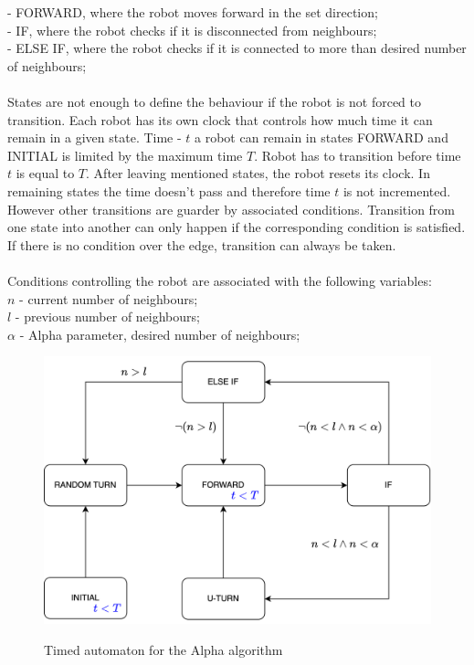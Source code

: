 - FORWARD, where the robot moves forward in the set direction;\\
- IF, where the robot checks if it is disconnected from neighbours;\\
- ELSE IF, where the robot checks if it is connected to more than desired number of neighbours;\\\\
States are not enough to define the behaviour if the robot is not forced to transition. Each robot has its own clock that controls how much time it can remain in a given state. Time - $t$ a robot can remain in states FORWARD and INITIAL is limited by the maximum time $T$.
Robot has to transition before time $t$ is equal to $T$. After leaving mentioned states, the robot resets its clock. In remaining states the time doesn't pass and therefore time $t$ is not incremented. However other transitions are guarder by associated conditions. Transition from one state into another can only happen if the corresponding condition is satisfied. If there is no condition over the edge, transition can always be taken.\\\\ Conditions controlling the robot are associated with the following variables:\\
$n$ - current number of neighbours;\\
$l$ - previous number of neighbours;\\
$\alpha$ - Alpha parameter, desired number of neighbours;\\
\begin{figure}[h!]
\caption{Timed automaton for the Alpha algorithm}
\includegraphics[scale=0.9]{images/automaton.png}
\label{fig:automaton}
\end{figure}